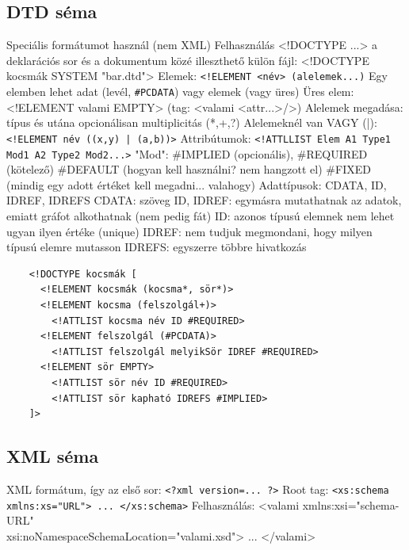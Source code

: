 \documentclass[12pt,a4paper]{article}
\begin{document}
\pagebreak

\subsection{DTD séma}

\begin{outline}
	\1 Speciális formátumot használ (nem XML)
	\1 Felhasználás
		\2 <!DOCTYPE ...> a deklarációs sor és a dokumentum közé illeszthető
		\2 külön fájl: <!DOCTYPE kocsmák SYSTEM "bar.dtd">
	\1 Elemek: \texttt{<!ELEMENT <név> (alelemek...)}
		\2 Egy elemben lehet adat (levél, \texttt{\#PCDATA}) vagy elemek (vagy üres)
		\2 Üres elem: <!ELEMENT valami EMPTY> (tag: <valami <attr...>/>)
		\2 Alelemek megadása: típus és utána opcionálisan multiplicitás (*,+,?)
		\2 Alelemeknél van VAGY (|): \texttt{<!ELEMENT név ((x,y) | (a,b))>}
	\1 Attribútumok: \texttt{<!ATTLLIST Elem A1 Type1 Mod1 A2 Type2 Mod2...>}
		\2 "Mod": \#IMPLIED (opcionális), \#REQUIRED (kötelező)
			\3 \#DEFAULT (hogyan kell használni? nem hangzott el)
			\3 \#FIXED (mindig egy adott értéket kell megadni... valahogy)
		\2 Adattípusok: CDATA, ID, IDREF, IDREFS
			\3 CDATA: szöveg
			\3 ID, IDREF: egymásra mutathatnak az adatok, emiatt gráfot alkothatnak (nem pedig fát)
			\3 ID: azonos típusú elemnek nem lehet ugyan ilyen értéke (unique)
			\3 IDREF: nem tudjuk megmondani, hogy milyen típusú elemre mutasson
			\3 IDREFS: egyszerre többre hivatkozás
	\1 \begin{verbatim}
	<!DOCTYPE kocsmák [
	  <!ELEMENT kocsmák (kocsma*, sör*)>
	  <!ELEMENT kocsma (felszolgál+)>
	    <!ATTLIST kocsma név ID #REQUIRED>
	  <!ELEMENT felszolgál (#PCDATA)>
	    <!ATTLIST felszolgál melyikSör IDREF #REQUIRED>
	  <!ELEMENT sör EMPTY>
	    <!ATTLIST sör név ID #REQUIRED>
	    <!ATTLIST sör kapható IDREFS #IMPLIED>
	]>
	\end{verbatim}
\end{outline}

\pagebreak

\subsection{XML séma}

\begin{outline}
	\1 XML formátum, így az első sor: \texttt{<?xml version=... ?>}
	\1 Root tag: \texttt{<xs:schema xmlns:xs="URL"> ... </xs:schema>}
	\1 Felhasználás: <valami xmlns:xsi="schema-URL"\\
	xsi:noNamespaceSchemaLocation="valami.xsd"> ... </valami>
\end{outline}
\end{document}
